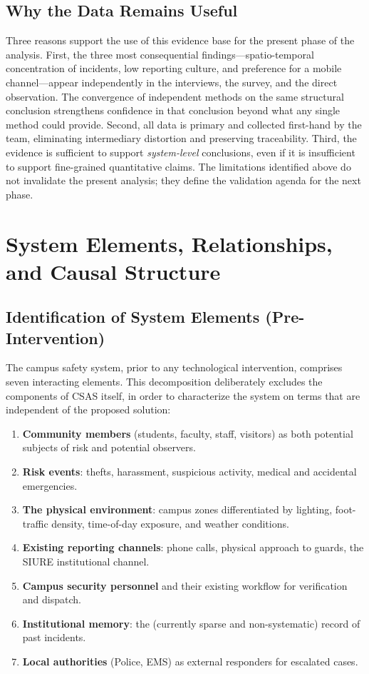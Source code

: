 \documentclass[conference]{IEEEtran}
\begin{document}
\subsection{Why the Data Remains Useful}
Three reasons support the use of this evidence base for the present
phase of the analysis. First, the three most consequential
findings---spatio-temporal concentration of incidents, low reporting
culture, and preference for a mobile channel---appear independently
in the interviews, the survey, and the direct observation. The
convergence of independent methods on the same structural conclusion
strengthens confidence in that conclusion beyond what any single
method could provide. Second, all data is primary and collected
first-hand by the team, eliminating intermediary distortion and
preserving traceability. Third, the evidence is sufficient to support
\emph{system-level} conclusions, even if it is insufficient to support
fine-grained quantitative claims. The limitations identified above do
not invalidate the present analysis; they define the validation agenda
for the next phase.

\section{System Elements, Relationships, and Causal Structure}

\subsection{Identification of System Elements (Pre-Intervention)}
\label{sec:elements}
The campus safety system, prior to any technological intervention,
comprises seven interacting elements. This decomposition deliberately
excludes the components of CSAS itself, in order to characterize the
system on terms that are independent of the proposed solution:

\begin{enumerate}[leftmargin=*,itemsep=2pt]
\item \textbf{Community members} (students, faculty, staff, visitors)
      as both potential subjects of risk and potential observers.
\item \textbf{Risk events}: thefts, harassment, suspicious activity,
      medical and accidental emergencies.
\item \textbf{The physical environment}: campus zones differentiated
      by lighting, foot-traffic density, time-of-day exposure, and
      weather conditions.
\item \textbf{Existing reporting channels}: phone calls, physical
      approach to guards, the SIURE institutional channel.
\item \textbf{Campus security personnel} and their existing workflow
      for verification and dispatch.
\item \textbf{Institutional memory}: the (currently sparse and
      non-systematic) record of past incidents.
\item \textbf{Local authorities} (Police, EMS) as external responders
      for escalated cases.
\end{enumerate}
\end{document}
